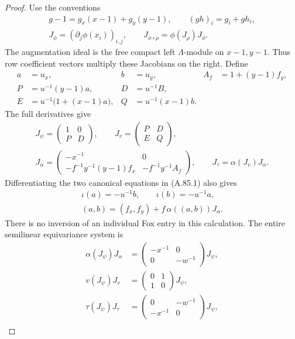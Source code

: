 \begin{proof}
Use the conventions
\[
 \begin{gathered}
 g-1=g_x(x-1)+g_y(y-1),\qquad
 (gh)_i=g_i+g h_i,\\
 J_\phi=(\partial_j\phi(x_i))_{i,j},\qquad
 J_{\phi\circ\rho}=\phi(J_\rho)J_\phi.
 \end{gathered}
\]
The augmentation ideal is the free compact left \(\Lambda\)-module
on \(x-1,y-1\). Thus row coefficient vectors multiply these
Jacobians on the right. Define
\[
 \begin{aligned}
 a&=u_x,& b&=u_y,& A_f&=1+(y-1)f_y,\\
 P&=u^{-1}(y-1)a,&D&=u^{-1}B,\\
 E&=u^{-1}\bigl(1+(x-1)a\bigr),&Q&=u^{-1}(x-1)b.
 \end{aligned}
\]
The full derivatives give
\[
 \begin{gathered}
 J_\psi=\begin{pmatrix}1&0\\P&D\end{pmatrix},\qquad
 J_v=\begin{pmatrix}P&D\\E&Q\end{pmatrix},\\
 J_\alpha=
 \begin{pmatrix}
 -x^{-1}&0\\
 -f^{-1}y^{-1}(y-1)f_x&-f^{-1}y^{-1}A_f
 \end{pmatrix},
 \qquad J_\tau=\alpha(J_v)J_\alpha.
 \end{gathered}
 \tag{A.85.8}
\]
Differentiating the two canonical equations in (A.85.1) also gives
\[
 \begin{gathered}
 \iota(a)=-u^{-1}b,\qquad\iota(b)=-u^{-1}a,\\
 (a,b)=(f_x,f_y)+f\,\alpha((a,b))J_\alpha.
 \end{gathered}
 \tag{A.85.9}
\]
There is no inversion of an individual Fox entry in this calculation.
The entire semilinear equivariance system is
\[
 \begin{aligned}
 \alpha(J_\psi)J_\alpha
     &=\begin{pmatrix}-x^{-1}&0\\0&-w^{-1}\end{pmatrix}J_\psi,\\
 v(J_\psi)J_v
     &=\begin{pmatrix}0&1\\1&0\end{pmatrix}J_\psi,\\
 \tau(J_\psi)J_\tau
     &=\begin{pmatrix}0&-w^{-1}\\-x^{-1}&0\end{pmatrix}J_\psi,\\

\end{aligned}\]
\end{proof}
